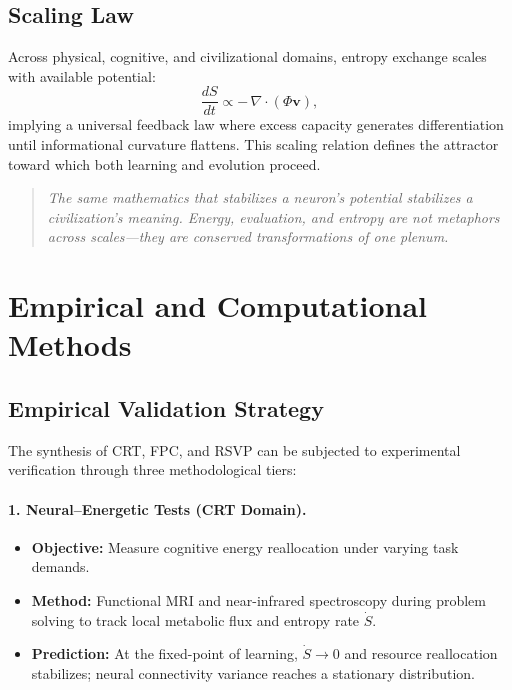\documentclass[12pt,a4paper]{article}
\begin{document}
\subsection{Scaling Law}

Across physical, cognitive, and civilizational domains,
entropy exchange scales with available potential:
\[
\frac{dS}{dt}\propto -\,\nabla\!\cdot(\Phi\mathbf{v}),
\]
implying a universal feedback law where excess capacity generates differentiation until informational curvature flattens.
This scaling relation defines the attractor toward which both learning and evolution proceed.

\begin{quote}
\emph{The same mathematics that stabilizes a neuron’s potential stabilizes a civilization’s meaning.
Energy, evaluation, and entropy are not metaphors across scales—they are conserved transformations of one plenum.}
\end{quote}

\section{Empirical and Computational Methods}

\subsection{Empirical Validation Strategy}

The synthesis of CRT, FPC, and RSVP can be subjected to experimental verification through three methodological tiers:

\paragraph{1. Neural–Energetic Tests (CRT Domain).}
\begin{itemize}[leftmargin=1.2em]
  \item \textbf{Objective:} Measure cognitive energy reallocation under varying task demands.
  \item \textbf{Method:} Functional MRI and near-infrared spectroscopy during problem solving to track local metabolic flux and entropy rate $\dot S$.
  \item \textbf{Prediction:} At the fixed-point of learning, $\dot S \!\to\! 0$ and resource reallocation stabilizes; neural connectivity variance reaches a stationary distribution.
\end{itemize}
\end{document}
